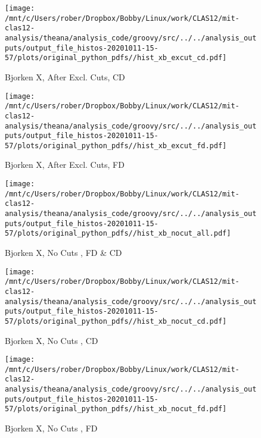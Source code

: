 \documentclass{article}
\begin{document}
\begin{landscape}
    \begin{figure}[h]
        \centering

        \texttt{[image: /mnt/c/Users/rober/Dropbox/Bobby/Linux/work/CLAS12/mit-clas12-analysis/theana/analysis\_code/groovy/src/../../analysis\_outputs/output\_file\_histos-20201011-15-57/plots/original\_python\_pdfs//hist\_xb\_excut\_cd.pdf]}
        \captionsetup{textformat=empty,labelformat=blank}
        \caption{Bjorken X, After Excl. Cuts, CD}
    \end{figure}
    \clearpage
    
    \begin{figure}[h]
        \centering

        \texttt{[image: /mnt/c/Users/rober/Dropbox/Bobby/Linux/work/CLAS12/mit-clas12-analysis/theana/analysis\_code/groovy/src/../../analysis\_outputs/output\_file\_histos-20201011-15-57/plots/original\_python\_pdfs//hist\_xb\_excut\_fd.pdf]}
        \captionsetup{textformat=empty,labelformat=blank}
        \caption{Bjorken X, After Excl. Cuts, FD}
    \end{figure}
    \clearpage
    
    \begin{figure}[h]
        \centering

        \texttt{[image: /mnt/c/Users/rober/Dropbox/Bobby/Linux/work/CLAS12/mit-clas12-analysis/theana/analysis\_code/groovy/src/../../analysis\_outputs/output\_file\_histos-20201011-15-57/plots/original\_python\_pdfs//hist\_xb\_nocut\_all.pdf]}
        \captionsetup{textformat=empty,labelformat=blank}
        \caption{Bjorken X, No Cuts , FD \& CD}
    \end{figure}
    \clearpage
    
    \begin{figure}[h]
        \centering

        \texttt{[image: /mnt/c/Users/rober/Dropbox/Bobby/Linux/work/CLAS12/mit-clas12-analysis/theana/analysis\_code/groovy/src/../../analysis\_outputs/output\_file\_histos-20201011-15-57/plots/original\_python\_pdfs//hist\_xb\_nocut\_cd.pdf]}
        \captionsetup{textformat=empty,labelformat=blank}
        \caption{Bjorken X, No Cuts , CD}
    \end{figure}
    \clearpage
    
    \begin{figure}[h]
        \centering

        \texttt{[image: /mnt/c/Users/rober/Dropbox/Bobby/Linux/work/CLAS12/mit-clas12-analysis/theana/analysis\_code/groovy/src/../../analysis\_outputs/output\_file\_histos-20201011-15-57/plots/original\_python\_pdfs//hist\_xb\_nocut\_fd.pdf]}
        \captionsetup{textformat=empty,labelformat=blank}
        \caption{Bjorken X, No Cuts , FD}
    \end{figure}
    \clearpage
    

\end{landscape}
\end{document}
